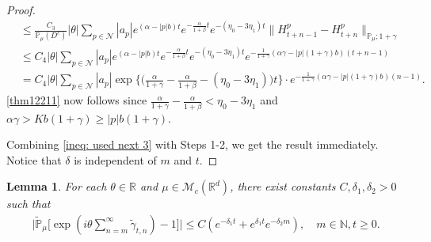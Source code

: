 \documentclass[12pt,a4paper]{amsart}
\theoremstyle{plain}
\newtheorem{lem}[thm]{Lemma}
\theoremstyle{definition}
\numberwithin{equation}{section}
\begin{document}
\begin{proof}
\begin{align}
    &\leq \frac{C_3}{\mathbb{P}_{\mu}(D^c)} |\theta|\sum_{p\in\mathcal{N}}|a_p|e^{(\alpha-|p|b)t}e^{-\frac{\alpha}{1+\beta}t}e^{-(\eta_0-3\eta_1)t}\|H_{t+n-1}^p-H_{t+n}^p\|_{\mathbb{P}_{\mu};1+\gamma}
    \\&\leq C_4|\theta|\sum_{p\in\mathcal{N}}|a_p|e^{(\alpha-|p|b)t}e^{-\frac{\alpha}{1+\beta}t}e^{-(\eta_0-3\eta_1)t}e^{-\frac{1}{1+\gamma}(\alpha\gamma-|p|(1+\gamma)b)(t+n-1)}\\
    &=C_4|\theta|\sum_{p\in\mathcal{N}}|a_p|\exp\Big\{\Big(\frac{\alpha}{1+\gamma}-\frac{\alpha}{1+\beta}-(\eta_0-3\eta_1)\Big)t\Big\}\cdot e^{-\frac{1}{1+\gamma}(\alpha\gamma-|p|(1+\gamma)b)(n-1)}.
\end{align}
    \eqref{thm12211} now follows  since $\frac{\alpha}{1+\gamma}-\frac{\alpha}{1+\beta}<\eta_0-3\eta_1$ and $\alpha\gamma>Kb(1+\gamma)\geq |p|b(1+\gamma)$.

    Combining \eqref{ineq: used next 3} with Steps 1-2, we get the result immediately. Notice that $\delta$ is independent of $m$ and $t$.
\end{proof}
\begin{lem}\label{lem: lemma05}
    For each $\theta\in \mathbb{R}$ and $\mu \in \mathcal{M}_c(\mathbb{R}^d)$, there exist constants $C,\delta_1,\delta_2>0$ such that
\begin{align}
    \Big|\tilde{\mathbb{P}}_{\mu}\Big[\exp(i\theta \sum_{n=m}^{\infty}\tilde{\gamma}_{t,n})-1\Big]\Big|
    \leq C(e^{-\delta_1 t}+e^{\delta_1 t}e^{-\delta_2 m}),
    \quad m\in \mathbb{N}, t\geq 0.
\end{align}
\end{lem}
\end{document}
